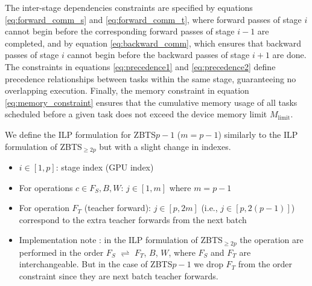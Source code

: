 \documentclass{article}
\begin{document}
The inter-stage dependencies constraints are specified by equations \ref{eq:forward_comm_s} and \ref{eq:forward_comm_t}, where forward passes of stage $i$ cannot begin before the corresponding forward passes of stage $i-1$ are completed, and by equation \ref{eq:backward_comm}, which ensures that backward passes of stage $i$ cannot begin before the backward passes of stage $i+1$ are done. The constraints in equations \ref{eq:precedence1} and \ref{eq:precedence2} define precedence relationships between tasks within the same stage, guaranteeing no overlapping execution. Finally, the memory constraint in equation \ref{eq:memory_constraint} ensures that the cumulative memory usage of all tasks scheduled before a given task does not exceed the device memory limit $M_{\text{limit}}$.



We define the ILP formulation for ZBTS${p-1}$ ($m=p-1$) similarly to the ILP formulation of ZBTS$_{\ge 2p}$ but with a slight change in indexes.

\begin{itemize}
\item $i \in [1, p]$: stage index (GPU index)
\item For operations $c \in {F_S, B, W}$: $j \in [1, m]$ where $m = p-1$
\item For operation $F_T$ (teacher forward): $j \in [p, 2m]$ (i.e., $j \in [p, 2(p-1)]$) correspond to the extra teacher forwards from the next batch
\item Implementation note : in the ILP formulation of ZBTS$_{\ge 2p}$ the operation are performed in the order $F_S$ $\rightleftharpoons$ $F_T$, $B$, $W$, where $F_S$ and $F_T$ are interchangeable. But in the case of ZBTS${p-1}$ we drop $F_T$ from the order constraint since they are next batch teacher forwards.
\end{itemize}

\end{document}
